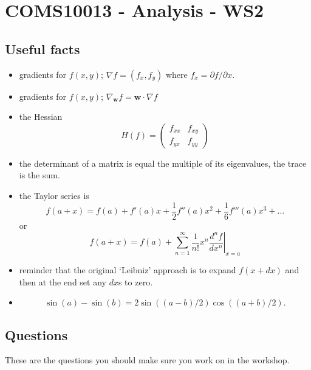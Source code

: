 \documentclass[11pt,a4paper]{scrartcl}
\begin{document}
\section*{COMS10013 - Analysis - WS2}

\subsection*{Useful facts}

\begin{itemize}
\item gradients for $f(x,y)$; $\nabla{f}=(f_x,f_y)$ where $f_x=\partial f/\partial x$.
\item gradients for $f(x,y)$; $\nabla_{\mathbf{w}}{f}=\mathbf{w}\cdot\nabla{f}$
\item the Hessian
$$H(f)=\left(\begin{array}{cc}f_{xx}&f_{xy}\\f_{yx}&f_{yy}\end{array}\right)$$
\item the determinant of a matrix is equal the multiple of its eigenvalues, the trace is the sum.
\item the Taylor series is
  $$f(a+x)=f(a)+f'(a)x+\frac{1}{2}f''(a)x^2+\frac{1}{6}f'''(a)x^3+\ldots$$
  or
  $$f(a+x)=f(a)+\sum_{n=1}^\infty \frac{1}{n!}x^n\left.\frac{d^nf}{dx^n}\right|_{x=a}$$
\item reminder that the original `Leibniz' approach is to expand $f(x+dx)$ and then at the end set any $dx$s to zero.
\item $$\sin(a) - \sin(b) = 2\sin((a-b)/2)\cos((a+b)/2).$$
\end{itemize}

\subsection*{Questions}

These are the questions you should make sure you work on in the workshop.
\end{document}
